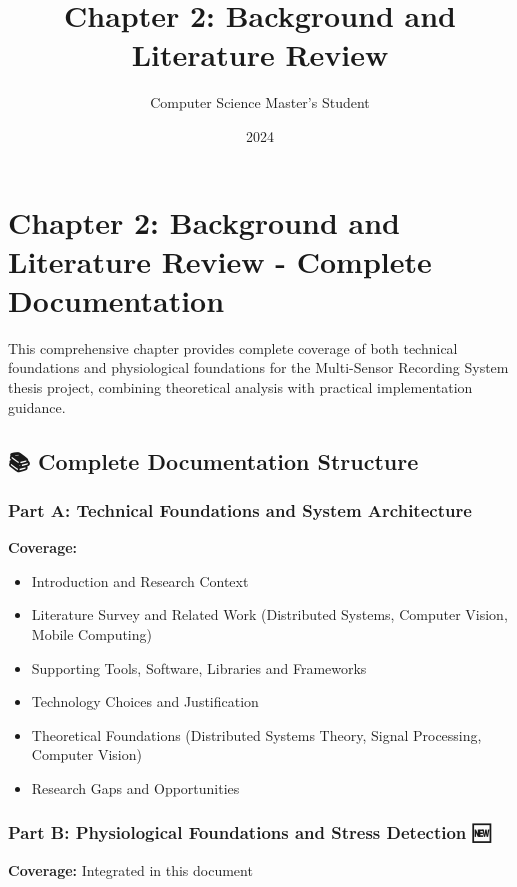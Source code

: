 \documentclass[11pt,a4paper]{article}
\title{Chapter 2: Background and Literature Review}
\author{Computer Science Master's Student}
\date{2024}
\begin{document}
\maketitle

\section{Chapter 2: Background and Literature Review - Complete Documentation}

This comprehensive chapter provides complete coverage of both technical foundations and physiological foundations for
the Multi-Sensor Recording System thesis project, combining theoretical analysis with practical implementation guidance.

\subsection{📚 Complete Documentation Structure}

\subsubsection{Part A: Technical Foundations and System Architecture}

\textbf{Coverage:}

\begin{itemize}
\item Introduction and Research Context
\item Literature Survey and Related Work (Distributed Systems, Computer Vision, Mobile Computing)
\item Supporting Tools, Software, Libraries and Frameworks
\item Technology Choices and Justification
\item Theoretical Foundations (Distributed Systems Theory, Signal Processing, Computer Vision)
\item Research Gaps and Opportunities

\end{itemize}
\subsubsection{Part B: Physiological Foundations and Stress Detection 🆕}

\textbf{Coverage:} Integrated in this document
\end{document}
